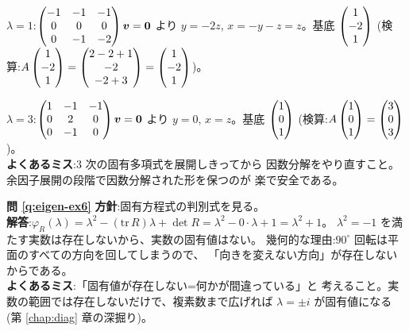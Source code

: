 $\lambda = 1$:$\begin{pmatrix}-1 & -1 & -1 \\ 0 & 0 & 0 \\ 0 & -1 & -2\end{pmatrix}\bm{v} = \bm{0}$
より $y = -2z$, $x = -y - z = z$。基底 $\begin{pmatrix}1 \\ -2 \\ 1\end{pmatrix}$
(検算:$A\begin{pmatrix}1 \\ -2 \\ 1\end{pmatrix} = \begin{pmatrix}2 - 2 + 1 \\ -2 \\ -2 + 3\end{pmatrix}
= \begin{pmatrix}1 \\ -2 \\ 1\end{pmatrix}$)。

$\lambda = 3$:$\begin{pmatrix}1 & -1 & -1 \\ 0 & 2 & 0 \\ 0 & -1 & 0\end{pmatrix}\bm{v} = \bm{0}$
より $y = 0$, $x = z$。基底 $\begin{pmatrix}1 \\ 0 \\ 1\end{pmatrix}$
(検算:$A\begin{pmatrix}1 \\ 0 \\ 1\end{pmatrix} = \begin{pmatrix}3 \\ 0 \\ 3\end{pmatrix}$)。\\
\textbf{よくあるミス}:$3$ 次の固有多項式を展開しきってから
因数分解をやり直すこと。余因子展開の段階で因数分解された形を保つのが
楽で安全である。

\bigskip
\noindent\textbf{問 \ref{q:eigen-ex6}}\quad
\textbf{方針}:固有方程式の判別式を見る。\\
\textbf{解答}:$\varphi_R(\lambda) = \lambda^2 - (\mathrm{tr}\,R)\lambda
+ \det R = \lambda^2 - 0 \cdot \lambda + 1 = \lambda^2 + 1$。
$\lambda^2 = -1$ を満たす実数は存在しないから、実数の固有値はない。
幾何的な理由:$90^\circ$ 回転は平面のすべての方向を回してしまうので、
「向きを変えない方向」が存在しないからである。\\
\textbf{よくあるミス}:「固有値が存在しない=何かが間違っている」と
考えること。実数の範囲では存在しないだけで、複素数まで広げれば
$\lambda = \pm i$ が固有値になる(第 \ref{chap:diag} 章の深掘り)。


